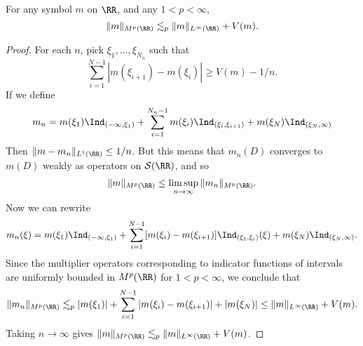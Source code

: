 \begin{theorem}
  For any symbol $m$ on $\RR$, and any $1 < p < \infty$,
  \[ \| m \|_{M^p(\RR)} \lesssim_p \| m \|_{L^\infty(\RR)} + V(m). \]
\end{theorem}
\begin{proof}
  For each $n$, pick $\xi_1,\dots,\xi_{N_n}$ such that
  \[ \sum_{i = 1}^{N-1} |m(\xi_{i+1}) - m(\xi_i)| \geq V(m) - 1/n. \]
  If we define
  \[ m_n = m(\xi_1) \Ind_{(-\infty,\xi_1)} + \sum_{i = 1}^{N_n-1} m(\xi_i) \Ind_{(\xi_i,\xi_{i+1})} + m(\xi_N) \Ind_{(\xi_N,\infty)} \]
  Then $\| m - m_n \|_{L^1(\RR)} \leq 1/n$. But this means that $m_n(D)$ converges to $m(D)$ weakly as operators on $\mathcal{S}(\RR)$, and so
  \[ \| m \|_{M^p(\RR)} \leq \limsup_{n \to \infty} \| m_n \|_{M^p(\RR)}. \]
  Now we can rewrite
  \[ m_n(\xi) = m(\xi_1) \Ind_{(-\infty,\xi_1)} + \sum_{i = 1}^{N-1} [m(\xi_i) - m(\xi_{i+1})] \Ind_{(\xi_1,\xi_i)}(\xi) + m(\xi_N) \Ind_{(\xi_N,\infty)}. \]
  Since the multiplier operators corresponding to indicator functions of intervals are uniformly bounded in $M^p(\RR)$ for $1 < p < \infty$, we conclude that
  \[ \| m_n \|_{M^p(\RR)} \lesssim_p |m(\xi_1)| + \sum_{i = 1}^{N-1} |m(\xi_i) - m(\xi_{i+1})| + |m(\xi_N)| \leq \| m \|_{L^\infty(\RR)} + V(m). \]
  Taking $n \to \infty$ gives $\| m \|_{M^p(\RR)} \lesssim_p \| m \|_{L^\infty(\RR)} + V(m)$.
\end{proof}

